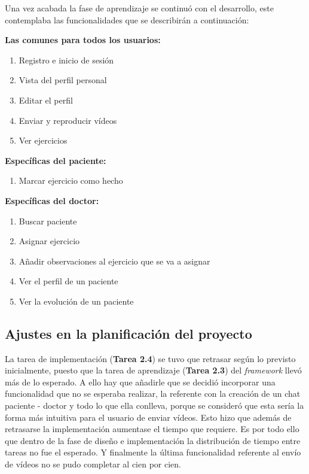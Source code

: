 \medskip
Una vez acabada la fase de aprendizaje se continuó con el desarrollo, este contemplaba las funcionalidades
que se describirán a continuación:

\medskip
\textbf{Las comunes para todos los usuarios:}
\begin{enumerate}
    \item Registro e inicio de sesión
    \item Vista del perfil personal
    \item Editar el perfil
    \item Enviar y reproducir vídeos
    \item Ver ejercicios
\end{enumerate}

\medskip
\textbf{Específicas del paciente:}
\begin{enumerate}
    \item Marcar ejercicio como hecho
\end{enumerate}

\medskip
\textbf{Específicas del doctor:}
\begin{enumerate}
    \item Buscar paciente
    \item Asignar ejercicio
    \item Añadir observaciones al ejercicio que se va a asignar
    \item Ver el perfil de un paciente
    \item Ver la evolución de un paciente
\end{enumerate}

\subsection{Ajustes en la planificación del proyecto}
La tarea de implementación (\textbf{Tarea 2.4}) se tuvo que retrasar según lo previsto inicialmente,
puesto que la tarea de aprendizaje (\textbf{Tarea 2.3}) del \textit{framework} llevó más de lo esperado.
A ello hay que añadirle que se decidió incorporar una funcionalidad que no se esperaba realizar,
la referente con la creación de un chat paciente - doctor y todo lo que ella conlleva, porque se
consideró que esta sería la forma más intuitiva para el usuario de enviar vídeos. Esto hizo que además
de retrasarse la implementación aumentase el tiempo que requiere. Es por todo ello que
dentro de la fase de diseño e implementación la distribución de tiempo entre tareas no fue el esperado.
Y finalmente la última funcionalidad referente al envío de vídeos no se pudo completar al cien por cien.

